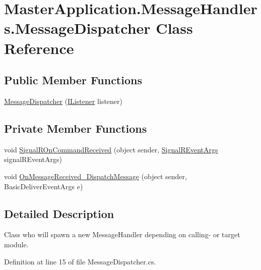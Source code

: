 \hypertarget{class_master_application_1_1_message_handlers_1_1_message_dispatcher}{}\section{Master\+Application.\+Message\+Handlers.\+Message\+Dispatcher Class Reference}
\label{class_master_application_1_1_message_handlers_1_1_message_dispatcher}
\subsection*{Public Member Functions}
\begin{DoxyCompactItemize}
\item 
\mbox{\hyperlink{class_master_application_1_1_message_handlers_1_1_message_dispatcher_a9aa911387692b4a67cbb63140ccda719}{Message\+Dispatcher}} (\mbox{\hyperlink{interface_master_application_1_1_threads_1_1_i_listener}{I\+Listener}} listener)
\end{DoxyCompactItemize}
\subsection*{Private Member Functions}
\begin{DoxyCompactItemize}
\item 
void \mbox{\hyperlink{class_master_application_1_1_message_handlers_1_1_message_dispatcher_ade63abb94bd2bd5c1efaa4231ca99bde}{Signal\+R\+On\+Command\+Received}} (object sender, \mbox{\hyperlink{class_master_application_1_1_signal_r_event_args}{Signal\+R\+Event\+Args}} signal\+R\+Event\+Args)
\item 
void \mbox{\hyperlink{class_master_application_1_1_message_handlers_1_1_message_dispatcher_a018717faf7b4a4e755da94b87272a302}{On\+Message\+Received\+\_\+\+Dispatch\+Message}} (object sender, Basic\+Deliver\+Event\+Args e)
\end{DoxyCompactItemize}


\subsection{Detailed Description}
Class who will spawn a new Message\+Handler depending on calling-\/ or target module. 

Definition at line 15 of file Message\+Dispatcher.\+cs.



